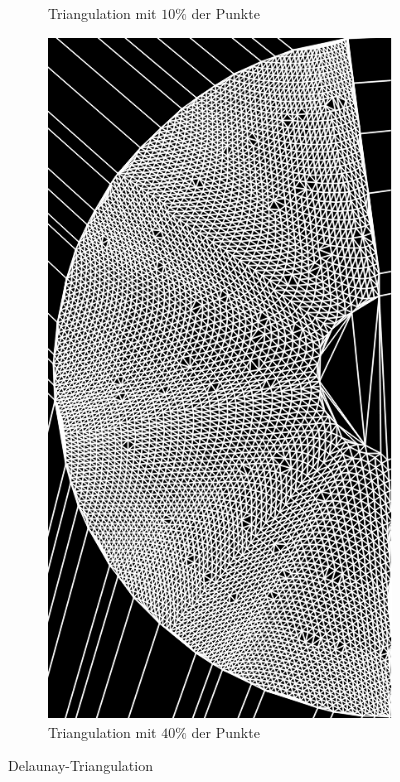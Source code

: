 \begin{figure}[!htb]
\begin{subfigure}{.9\textwidth}
		\caption{Triangulation mit $10\%$ der Punkte}
	\end{subfigure}
	\begin{subfigure}{.9\textwidth}
		\centering
		\includegraphics[angle=-90, width=.8\textwidth]{images/delaunay2.png}
		\caption{Triangulation mit $40\%$ der Punkte}
	\end{subfigure}
	\label{fig:delaunay}
	\caption{Delaunay-Triangulation}
\end{figure}



